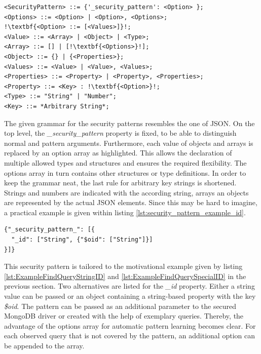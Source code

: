 \begin{lstlisting}[escapechar=!, caption={Proposed security pattern grammar for the injection mitigation mechanism}, label={lst:security_pattern_grammar}]
<SecurityPattern> ::= {'_security_pattern': <Option> };
<Options> ::= <Option> | <Option>, <Options>;
!\textbf{<Option> ::= [<Values>]}!;
<Value> ::= <Array> | <Object> | <Type>;
<Array> ::= [] | [!\textbf{<Options>}!];
<Object> ::= {} | {<Properties>};
<Values> ::= <Value> | <Value>, <Values>;
<Properties> ::= <Property> | <Property>, <Properties>;
<Property> ::= <Key> : !\textbf{<Option>}!;
<Type> ::= "String" | "Number";
<Key> ::= *Arbitrary String*;
\end{lstlisting}

The given grammar for the security patterns resembles the one of JSON. On the top level, the \emph{\_security\_pattern} property is fixed, to be able to distinguish normal and pattern arguments. Furthermore, each value of objects and arrays is replaced by an option array as highlighted. This allows the declaration of multiple allowed types and structures and ensures the required flexibility. The options array in turn contains other structures or type definitions. In order to keep the grammar neat, the last rule for arbitrary key strings is shortened. Strings and numbers are indicated with the according string, arrays an objects are represented by the actual JSON elements. Since this may be hard to imagine, a practical example is given within listing \ref{lst:security_pattern_example_id}. \\

\begin{lstlisting}[escapechar=!, caption={Security pattern allowing string-based and object-based identifiers as a query parameter}, label={lst:security_pattern_example_id}]
{"_security_pattern_": [{
  "_id": ["String", {"$oid": ["String"]}]
}]}
\end{lstlisting}

This security pattern is tailored to the motivational example given by listing \ref{lst:ExampleFindQueryStringID} and \ref{lst:ExampleFindQuerySpecialID} in the previous section. Two alternatives are listed for the \emph{\_id} property. Either a string value can be passed or an object containing a string-based property with the key \emph{\$oid}. The pattern can be passed as an additional parameter to the secured MongoDB driver or created with the help of exemplary queries. Thereby, the advantage of the options array for automatic pattern learning becomes clear. For each observed query that is not covered by the pattern, an additional option can be appended to the array. \\

